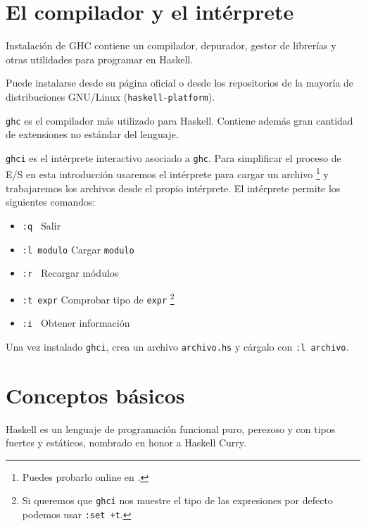 \section {El compilador y el intérprete}

\begin{otro}{Instalación de GHC}
contiene un compilador, depurador, gestor de librerías y otras utilidades
para programar en Haskell.

Puede instalarse desde su página oficial o desde los
repositorios de la mayoría de distribuciones GNU/Linux
(\texttt{haskell-platform}).
\end{otro}

\texttt{ghc} es el compilador más utilizado para Haskell. Contiene además gran cantidad
de extensiones no estándar del lenguaje.

\texttt{ghci} es el intérprete interactivo asociado a \texttt{ghc}.
Para simplificar el proceso de E/S en esta introducción usaremos el intérprete
para cargar un archivo \footnote{Puedes probarlo online en .}
y trabajaremos los archivos desde el propio intérprete.
El intérprete permite los siguientes comandos:

\begin{itemize}
 \item \texttt{:q \phantom{modulo}} \qquad  Salir
 \item \texttt{:l modulo} \qquad  Cargar \texttt{modulo}
 \item \texttt{:r \phantom{modulo}} \qquad  Recargar módulos
 \item \texttt{:t expr\phantom{lo}} \qquad  Comprobar tipo de \texttt{expr} \footnote{
 Si queremos que \texttt{ghci} nos muestre el tipo de las expresiones por defecto
 podemos usar \texttt{:set +t}.}
 \item \texttt{:i \phantom{modulo}} \qquad  Obtener información
\end{itemize}

Una vez instalado \texttt{ghci}, crea un archivo \texttt{archivo.hs} y
cárgalo con \texttt{:l archivo}.

\section{Conceptos básicos}

Haskell es un lenguaje de programación funcional puro, perezoso y con tipos fuertes
y estáticos, nombrado en honor a Haskell Curry.

